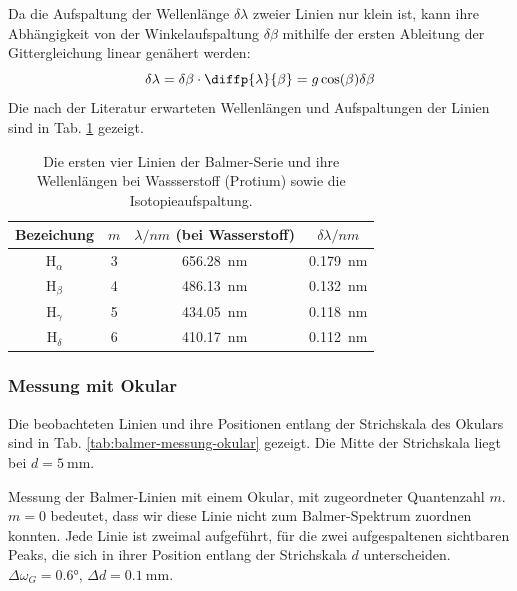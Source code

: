 \documentclass{article}
\begin{document}
Da die Aufspaltung der Wellenlänge $\delta \lambda$ zweier Linien nur klein ist, kann ihre Abhängigkeit von der
Winkelaufspaltung $\delta\beta$ mithilfe der ersten Ableitung der Gittergleichung linear genähert werden:
\begin{equation}
  \delta\lambda = \delta\beta \cdot \diffp{\lambda}{\beta} = g\cos(\beta)\delta\beta \label{eq:balmer-aufspaltung}
\end{equation}
Die nach der Literatur erwarteten Wellenlängen und Aufspaltungen der Linien sind in Tab. \ref{tab:balmer-literatur} gezeigt.

\begin{table}[h]
  \centering
  \begin{tabular}{c||c|c|c}
    Bezeichung & $m$ & $\lambda/\si{nm}$ (bei Wasserstoff) & $\delta \lambda/\si{nm}$ \\ \hline
    H$_\alpha$ & 3 & \SI{656.28}{\nm} & \SI{0.179}{\nm} \\
    H$_\beta$  & 4 & \SI{486.13}{\nm} & \SI{0.132}{\nm} \\
    H$_\gamma$ & 5 & \SI{434.05}{\nm} & \SI{0.118}{\nm} \\
    H$_\delta$ & 6 & \SI{410.17}{\nm} & \SI{0.112}{\nm}
  \end{tabular}
  \caption{Die ersten vier Linien der Balmer-Serie und ihre Wellenlängen bei Wassserstoff (Protium) sowie die Isotopieaufspaltung. \cite{leybold-balmer}}
  \label{tab:balmer-literatur}
\end{table}


\subsubsection{Messung mit Okular}
Die beobachteten Linien und ihre Positionen entlang der Strichskala des Okulars sind in Tab. \ref{tab:balmer-messung-okular}
gezeigt. Die Mitte der Strichskala liegt bei $d = \SI{5}{\mm}$.
\begin{table}[h]
  \centering
  \caption{Messung der Balmer-Linien mit einem Okular, mit zugeordneter Quantenzahl $m$.
  $m=0$ bedeutet, dass wir diese Linie nicht zum Balmer-Spektrum zuordnen konnten.
  Jede Linie ist zweimal aufgeführt, für die zwei aufgespaltenen sichtbaren Peaks, die sich in ihrer Position entlang der Strichskala $d$ unterscheiden.
  $\Delta \omega_G=\ang{0.6}$, $\Delta d=\SI{0.1}{\mm}$.}
  \label{tab:balmer-messung-okular}
\end{table}
\end{document}
